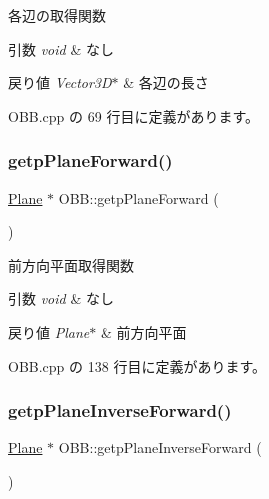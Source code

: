 各辺の取得関数 


\begin{DoxyParams}{引数}
{\em void} & なし \\
\hline
\end{DoxyParams}

\begin{DoxyRetVals}{戻り値}
{\em Vector3\+D$\ast$} & 各辺の長さ \\
\hline
\end{DoxyRetVals}


 O\+B\+B.\+cpp の 69 行目に定義があります。

\mbox{\label{class_o_b_b_abd61bbe178f1331e4ed4eaef760b6c7a}} 
\subsubsection{\texorpdfstring{getp\+Plane\+Forward()}{getpPlaneForward()}}
{\footnotesize\ttfamily \mbox{\hyperlink{class_plane}{Plane}} $\ast$ O\+B\+B\+::getp\+Plane\+Forward (\begin{DoxyParamCaption}{ }\end{DoxyParamCaption})}



前方向平面取得関数 


\begin{DoxyParams}{引数}
{\em void} & なし \\
\hline
\end{DoxyParams}

\begin{DoxyRetVals}{戻り値}
{\em Plane$\ast$} & 前方向平面 \\
\hline
\end{DoxyRetVals}


 O\+B\+B.\+cpp の 138 行目に定義があります。

\mbox{\label{class_o_b_b_a276db72b9b373f2fe15be1113c048fb2}} 
\subsubsection{\texorpdfstring{getp\+Plane\+Inverse\+Forward()}{getpPlaneInverseForward()}}
{\footnotesize\ttfamily \mbox{\hyperlink{class_plane}{Plane}} $\ast$ O\+B\+B\+::getp\+Plane\+Inverse\+Forward (\begin{DoxyParamCaption}{ }\end{DoxyParamCaption})}



